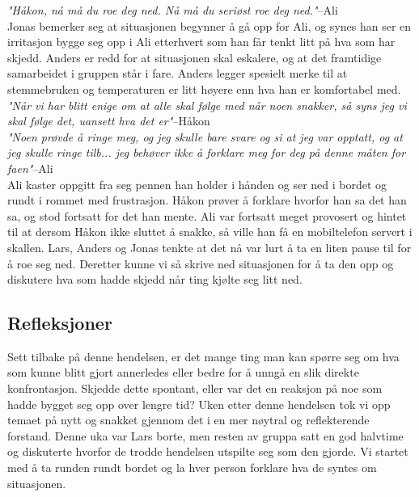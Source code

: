 \textit{"Håkon, nå må du roe deg ned. Nå må du seriøst roe deg ned."}{--Ali}\\

Jonas bemerker seg at situasjonen begynner å gå opp for Ali, og synes han ser en irritasjon bygge seg opp i Ali etterhvert som han får tenkt litt på hva som har skjedd. Anders er redd for at situasjonen skal eskalere, og at det framtidige samarbeidet i gruppen står i fare. Anders legger spesielt merke til at stemmebruken og temperaturen er litt høyere enn hva han er komfortabel med.\\

\textit{"Når vi har blitt enige om at alle skal følge med når noen snakker, så syns jeg vi skal følge det, uansett hva det er"}{--Håkon}\\

\textit{"Noen prøvde å ringe meg, og jeg skulle bare svare og si at jeg var opptatt, og at jeg skulle ringe tilb... jeg behøver ikke å forklare meg for deg på denne måten for faen"}{--Ali}\\

Ali kaster oppgitt fra seg pennen han holder i hånden og ser ned i bordet og rundt i rommet med frustrasjon. Håkon prøver å forklare hvorfor han sa det han sa, og stod fortsatt for det han mente. Ali var fortsatt meget provosert og hintet til at dersom Håkon ikke sluttet å snakke, så ville han få en mobiltelefon servert i skallen. Lars, Anders og Jonas tenkte at det nå var lurt å ta en liten pause til for å roe seg ned. Deretter kunne vi så skrive ned situasjonen for å ta den opp og diskutere hva som hadde skjedd når ting kjølte seg litt ned.

\newpage

\subsection{Refleksjoner}

Sett tilbake på denne hendelsen, er det mange ting man kan spørre seg om hva som kunne blitt gjort annerledes eller bedre for å unngå en slik direkte konfrontasjon. Skjedde dette spontant, eller var det en reaksjon på noe som hadde bygget seg opp over lengre tid? Uken etter denne hendelsen tok vi opp temaet på nytt og snakket gjennom det i en mer nøytral og reflekterende forstand. Denne uka var Lars borte, men resten av gruppa satt en god halvtime og diskuterte hvorfor de trodde hendelsen utspilte seg som den gjorde. Vi startet med å ta runden rundt bordet og la hver person forklare hva de syntes om situasjonen.\\

